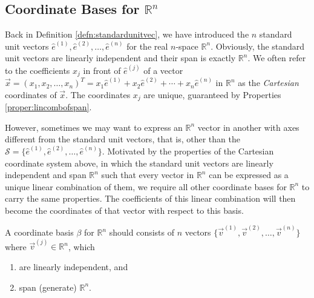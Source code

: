 \subsection{Coordinate Bases for $\mathbb{R}^n$}
\label{section:6.1.5}
Back in Definition \ref{defn:standardunitvec}, we have introduced the $n$ standard unit vectors $\hat{e}^{(1)}, \hat{e}^{(2)}, \ldots, \hat{e}^{(n)}$ for the real $n$-space $\mathbb{R}^n$. Obviously, the standard unit vectors are linearly independent and their span is exactly $\mathbb{R}^n$. We often refer to the coefficients $x_j$ in front of $\hat{e}^{(j)}$ of a vector $\vec{x} = (x_1, x_2, \ldots, x_n)^T = x_1\hat{e}^{(1)} + x_2\hat{e}^{(2)} + \cdots + x_n\hat{e}^{(n)}$ in $\mathbb{R}^n$ as the \textit{Cartesian} coordinates of $\vec{x}$. The coordinates $x_j$ are unique, guaranteed by Properties \ref{proper:lincombofspan}.\par
However, sometimes we may want to express an $\mathbb{R}^n$ vector in another  with axes different from the standard unit vectors, that is, other than the  $\mathcal{S} = \{\hat{e}^{(1)}, \hat{e}^{(2)}, \ldots, \hat{e}^{(n)}\}$. Motivated by the properties of the Cartesian coordinate system above, in which the standard unit vectors are linearly independent and span $\mathbb{R}^n$ such that every vector in $\mathbb{R}^n$ can be expressed as a unique linear combination of them, we require all other coordinate bases for $\mathbb{R}^n$ to carry the same properties. The coefficients of this linear combination will then become the coordinates of that vector with respect to this basis.
\begin{defn}
\label{defn:coordRn}
A coordinate basis $\mathcal{\beta}$ for $\mathbb{R}^n$ should consists of $n$ vectors $\{\vec{v}^{(1)}, \vec{v}^{(2)}, \ldots, \vec{v}^{(n)}\}$ where $\vec{v}^{(j)} \in \mathbb{R}^n$, which
\begin{enumerate}[label=(\alph*)]
\item are linearly independent, and
\item span (generate) $\mathbb{R}^n$.
\end{enumerate}
\end{defn}

